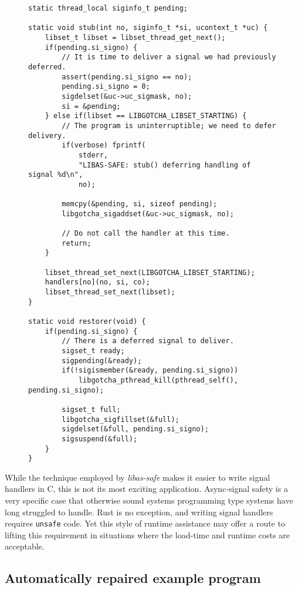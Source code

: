 \begin{figure}
\begin{lstlisting}[label=lst:assafe_helpers,caption=\textit{libas-safe}'s signal handler wrapper and control library callback,morekeywords=thread_local]
static thread_local siginfo_t pending;

static void stub(int no, siginfo_t *si, ucontext_t *uc) {
	libset_t libset = libset_thread_get_next();
	if(pending.si_signo) {
		// It is time to deliver a signal we had previously deferred.
		assert(pending.si_signo == no);
		pending.si_signo = 0;
		sigdelset(&uc->uc_sigmask, no);
		si = &pending;
	} else if(libset == LIBGOTCHA_LIBSET_STARTING) {
		// The program is uninterruptible; we need to defer delivery.
		if(verbose) fprintf(
			stderr,
			"LIBAS-SAFE: stub() deferring handling of signal %d\n",
			no);

		memcpy(&pending, si, sizeof pending);
		libgotcha_sigaddset(&uc->uc_sigmask, no);

		// Do not call the handler at this time.
		return;
	}

	libset_thread_set_next(LIBGOTCHA_LIBSET_STARTING);
	handlers[no](no, si, co);
	libset_thread_set_next(libset);
}

static void restorer(void) {
	if(pending.si_signo) {
		// There is a deferred signal to deliver.
		sigset_t ready;
		sigpending(&ready);
		if(!sigismember(&ready, pending.si_signo))
			libgotcha_pthread_kill(pthread_self(), pending.si_signo);

		sigset_t full;
		libgotcha_sigfillset(&full);
		sigdelset(&full, pending.si_signo);
		sigsuspend(&full);
	}
}
\end{lstlisting}
\end{figure}

While the technique employed by \textit{libas-safe} makes it easier to write signal
handlers in C, this is not its most exciting application.  Async-signal safety is a
very specific case that otherwise sound systems programming type systems have long
struggled to handle.  Rust is no exception, and writing signal handlers requires
\texttt{unsafe} code.  Yet this style of runtime assistance may offer a route to
lifting this requirement in situations where the load-time and runtime costs are
acceptable.


\subsection{Automatically repaired example program}
\label{sec:safety:handler}

